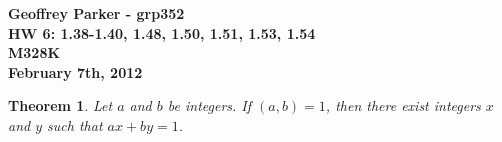 \documentclass[12pt,leqno]{article}
\numberwithin{equation}{section}
\newtheorem{thm}{Theorem}[section]
\theoremstyle{definition}
\begin{document}
\thispagestyle{plain}
\begin{flushright}
\large{\textbf{Geoffrey Parker - grp352 \\
HW 6: 1.38-1.40, 1.48, 1.50, 1.51, 1.53, 1.54\\
M328K \\
February 7th, 2012 \\}}
\end{flushright}

\markboth{}{} \setcounter{section}{0} \baselineskip=18pt

\setcounter{tocdepth}{4}



\setcounter{section}{1}


\setcounter{thm}{37}
\begin{thm}
Let $a$ and $b$ be integers. If $(a, b) = 1$, then there exist
integers $x$ and $y$ such that $ax + by = 1$.
\end{thm}
\end{document}

